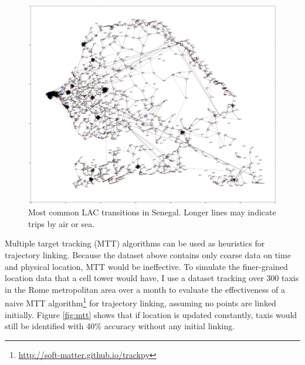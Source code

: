 \begin{figure}\begin{center}
		\includegraphics[width=\textwidth]{graphics/senegalmap}
		\caption{Most common LAC transitions in Senegal. Longer lines may indicate trips by air or sea.
			\label{fig:senegal}}
\end{center}\end{figure}

Multiple target tracking (MTT) algorithms\cite{nillius2006multi} can be used as heuristics for trajectory linking. Because the dataset above contains only coarse data on time and physical location, MTT would be ineffective. To simulate the finer-grained location data that a cell tower would have, I use a dataset tracking over 300 taxis in the Rome metropolitan area over a month\cite{cunha2015understanding} to evaluate the effectiveness of a naive MTT algorithm\footnote{\url{http://soft-matter.github.io/trackpy}} for trajectory linking, assuming no points are linked initially. Figure \ref{fig:mtt} shows that if location is updated constantly, taxis would still be identified with 40\% accuracy without any initial linking.


